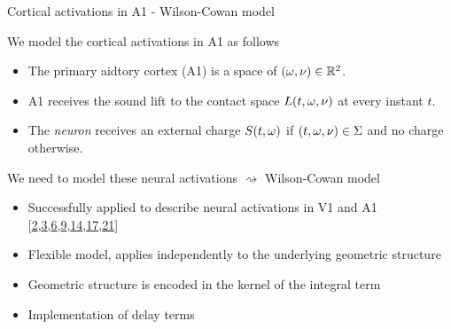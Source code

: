 \documentclass[10pt,american,ignorenonframetext,aspectratio=1610]{beamer}
\providecommand{\tightlist}{%
  \setlength{\itemsep}{0pt}\setlength{\parskip}{0pt}}
\theoremstyle{remark}
\begin{document}
\begin{frame}{Cortical activations in A1 - Wilson-Cowan model}
\protect\hypertarget{cortical-activations-in-a1---wilson-cowan-model}{}

We model the cortical activations in A1 as follows

\begin{itemize}
\tightlist
\item
  The primary aidtory cortex (A1) is a space of \((\omega,\nu)\in\mathbb{R}^2\).
\item
  A1 receives the sound lift to the contact space \(L(t,\omega,\nu)\) at
  every instant \(t\).
\item
  The \emph{neuron} receives an external charge \(S(t,\omega)\) if
  \((t,\omega,\nu)\in\Sigma\) and no charge otherwise.
\end{itemize}

We need to model these neural activations \(\rightsquigarrow\)
Wilson-Cowan model

\begin{itemize}
\tightlist
\item
  Successfully applied to describe neural activations in V1 and A1
  {[}\protect\hyperlink{ref-bertalmio2018}{2},\protect\hyperlink{ref-boscain2017}{3},\protect\hyperlink{ref-bressloff2002a}{6},\protect\hyperlink{ref-ermentrout1979}{9},\protect\hyperlink{ref-loebel2007}{14},\protect\hyperlink{ref-rankin2015}{17},\protect\hyperlink{ref-zulfiqar2019}{21}{]}
\item
  Flexible model, applies independently to the underlying geometric
  structure
\item
  Geometric structure is encoded in the kernel of the integral term
\item
  Implementation of delay terms
\end{itemize}

\end{frame}
\end{document}
